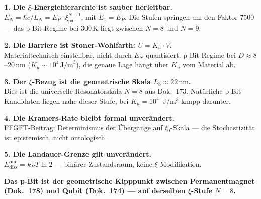 	\begin{conclusionBox}
		{\small\sloppy
		\textbf{1. Die $\xi$-Energiehierarchie ist sauber herleitbar.}\\
		$E_N = \hbar c/L_N = E_P\cdot\xi_\text{par}^{N-1}$, mit $E_1 = E_P$.
		Die Stufen springen um den Faktor $7500$ --- das p-Bit-Regime bei
		300\,K liegt zwischen $N=8$ und $N=9$.
		
		\textbf{2. Die Barriere ist Stoner-Wohlfarth: $U = K_u \cdot V$.}\\
		Materialtechnisch einstellbar, nicht durch $E_N$ quantisiert.
		p-Bit-Regime bei $D \approx 8$--$20\,\text{nm}$ ($K_u \sim 10^4\,\text{J/m}^3$),
		die genaue Lage hängt über $K_u$ vom Material ab.
		
		\textbf{3. Der $\xi$-Bezug ist die geometrische Skala $L_8 \approx 22\,\text{nm}$.}\\
		Dies ist die universelle Resonatorskala $N=8$ aus Dok.~173.
		Natürliche p-Bit-Kandidaten liegen nahe dieser Stufe,
		bei $K_u = 10^4$~J/m$^3$ knapp darunter.
		
		\textbf{4. Die Kramers-Rate bleibt formal unverändert.}\\
		FFGFT-Beitrag: Determinismus der Übergänge auf $t_0$-Skala ---
		die Stochastizität ist epistemisch, nicht ontologisch.
		
		\textbf{5. Die Landauer-Grenze gilt unverändert.}\\
		$E_\text{diss}^\text{min} = k_BT\ln 2$ --- binärer Zustandsraum,
		keine $\xi$-Modifikation.
		
		\vspace{0.5em}
		\textbf{Das p-Bit ist der geometrische Kipppunkt zwischen Permanentmagnet
			(Dok.~178) und Qubit (Dok.~174) --- auf derselben $\xi$-Stufe $N=8$.}
		} %
	\end{conclusionBox}
	
